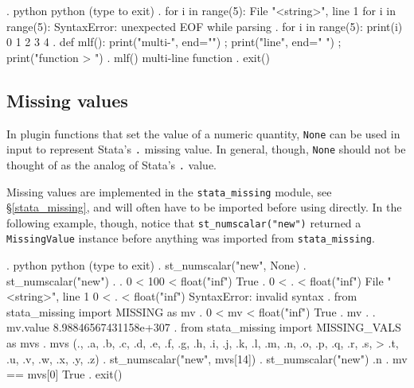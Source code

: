 \documentclass{article}
\begin{document}
\smallskip

\begin{stlog}
. python
 python (type {} to exit) 
{\bftt{>>>}}. for i in range(5):
{\color{red}  File "<string>", line 1
    for i in range(5):
                     {\caret}
SyntaxError: unexpected EOF while parsing}
{\smallskip}
{\bftt{>>>}}. for i in range(5): print(i)
0
1
2
3
4
{\smallskip}
{\bftt{>>>}}. def mlf(): print("multi-", end="") ; print("line", end=" ") ; print("function
> ")
{\smallskip}
{\bftt{>>>}}. mlf()
multi-line function
{\smallskip}
{\bftt{>>>}}. exit()
\end{stlog}

\smallskip



\subsection{Missing values} \label{missing_value_example}

In plugin functions that set the value of a numeric quantity, \lstinline$None$ can be used in input to represent Stata's \lstinline$.$ missing value. In general, though, \lstinline$None$ should not be thought of as the analog of Stata's \lstinline{.} value.

Missing values are implemented in the \lstinline$stata_missing$ module, see \S\ref{stata_missing}, and will often have to be imported before using directly. In the following example, though, notice that \lstinline{st_numscalar("new")} returned a \lstinline{MissingValue} instance before anything was imported from \lstinline{stata_missing}.

\smallskip

\begin{stlog}
. python
 python (type {} to exit) 
{\bftt{>>>}}. st_numscalar("new", None)
{\smallskip}
{\bftt{>>>}}. st_numscalar("new")
.
{\smallskip}
{\bftt{>>>}}. 0 < 100 < float("inf")
True
{\smallskip}
{\bftt{>>>}}. 0 < . < float("inf")
{\color{red}  File "<string>", line 1
    0 < . < float("inf")
        {\caret}
SyntaxError: invalid syntax}
{\smallskip}
{\bftt{>>>}}. from stata_missing import MISSING as mv
{\smallskip}
{\bftt{>>>}}. 0 < mv < float("inf")
True
{\smallskip}
{\bftt{>>>}}. mv
.
{\smallskip}
{\bftt{>>>}}. mv.value
8.98846567431158e+307
{\smallskip}
{\bftt{>>>}}. from stata_missing import MISSING_VALS as mvs
{\smallskip}
{\bftt{>>>}}. mvs
(., .a, .b, .c, .d, .e, .f, .g, .h, .i, .j, .k, .l, .m, .n, .o, .p, .q, .r, .s,
>  .t, .u, .v, .w, .x, .y, .z)
{\smallskip}
{\bftt{>>>}}. st_numscalar("new", mvs[14])
{\smallskip}
{\bftt{>>>}}. st_numscalar("new")
.n
{\smallskip}
{\bftt{>>>}}. mv == mvs[0]
True
{\smallskip}
{\bftt{>>>}}. exit()
\end{stlog}
\end{document}
